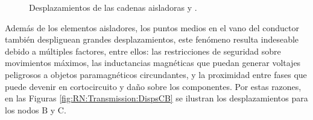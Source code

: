 \begingroup
\centering
\begin{figure}[htbp]
	\centering
	\caption{Desplazamientos de las cadenas aisladoras  y .} \label{fig:RN:Transmission:DispsAD}
\end{figure}
\endgroup

Además de los elementos aisladores, los puntos medios en el vano del conductor también despliguean grandes desplazamientos, este fenómeno resulta indeseable debido a múltiples factores, entre ellos: las restricciones de seguridad sobre movimientos máximos, las inductancias magnéticas que puedan generar voltajes peligrosos a objetos paramagnéticos circundantes, y la proximidad entre fases que puede devenir en cortocircuito y daño sobre los componentes. Por estas razones, en las Figuras \ref{fig:RN:Transmission:DispsCB} se ilustran los desplazamientos para los nodos $\text{B}$ y $\text{C}$. 


